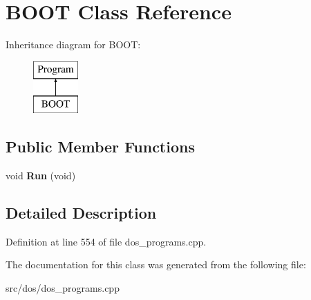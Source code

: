 \hypertarget{classBOOT}{\section{B\-O\-O\-T Class Reference}
\label{classBOOT}
}
Inheritance diagram for B\-O\-O\-T\-:\begin{figure}[H]
\begin{center}
\leavevmode
\includegraphics[height=2.000000cm]{classBOOT}
\end{center}
\end{figure}
\subsection*{Public Member Functions}
\begin{DoxyCompactItemize}
\item 
\hypertarget{classBOOT_a246ff7f80fc219360cdef4c3faa93d40}{void {\bfseries Run} (void)}\label{classBOOT_a246ff7f80fc219360cdef4c3faa93d40}

\end{DoxyCompactItemize}


\subsection{Detailed Description}


Definition at line 554 of file dos\-\_\-programs.\-cpp.



The documentation for this class was generated from the following file\-:\begin{DoxyCompactItemize}
\item 
src/dos/dos\-\_\-programs.\-cpp\end{DoxyCompactItemize}
